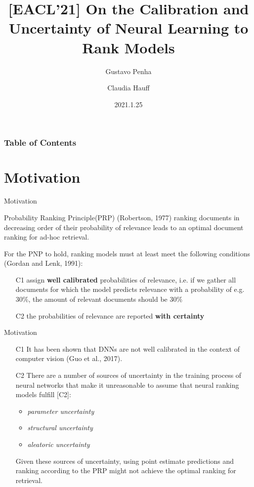 \documentclass{beamer}
\title[PaperSharing-(EACL'21)LTR]{[EACL'21] On the Calibration and Uncertainty of Neural Learning to Rank Models}
\author[Shengqiang Zhang]{Gustavo Penha \and Claudia Hauff}
\institute[Baidu]{Delft University of Technology, Delft, Netherlands}
\date{2021.1.25}
\begin{document}
\frame{\titlepage}

\begin{frame}
\frametitle{Table of Contents}
\tableofcontents
\end{frame}

\section{Motivation}
\begin{frame}{Motivation}
    \begin{block}{Probability Ranking Principle(PRP) (Robertson, 1977)}
    ranking documents in decreasing order of their probability of relevance leads to an optimal document ranking for ad-hoc retrieval.
    \end{block}
    
    For the PNP to hold, ranking models must at least meet the following conditions (Gordan and Lenk, 1991):
    \begin{itemize}
        \item [C1] assign \textbf{well calibrated} probabilities of relevance, i.e. if we gather all documents for which the model predicts relevance with a probability of e.g. 30\%, the amount of relevant documents should be 30\%
        \item [C2] the probabilities of relevance are reported \textbf{with certainty}
    \end{itemize}
    
\end{frame}

\begin{frame}{Motivation}
\begin{itemize}
    \item [C1] It has been shown that DNNs are not well calibrated in the context of computer vision (Guo et al., 2017).
    \item [C2] There are a number of sources of uncertainty in the training process of neural networks that make it unreasonable to assume that neural ranking models fulfill [C2]: 
    \begin{itemize}
        \item \textsl{parameter uncertainty}
        \item \textsl{structural uncertainty}
        \item \textsl{aleatoric uncertainty}
    \end{itemize}
    Given these sources of uncertainty, using point estimate predictions and ranking according to the PRP might not achieve the optimal ranking for retrieval.
\end{itemize}
\end{frame}
\end{document}
